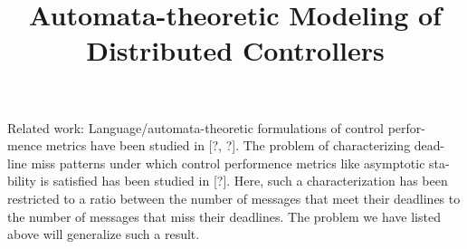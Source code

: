 \documentclass[runningheads,a4paper]{llncs}
\begin{document}
\title{Automata-theoretic Modeling of Distributed Controllers}
\maketitle




Related work: Language/automata-theoretic formulations of control perfor-
mence metrics have been studied in [?, ?]. The problem of characterizing dead-
line miss patterns under which control performence metrics like asymptotic sta-
bility is satisfied has been studied in [?]. Here, such a characterization has been
restricted to a ratio between the number of messages that meet their deadlines
to the number of messages that miss their deadlines. The problem we have
listed above will generalize such a result.
\end{document}
